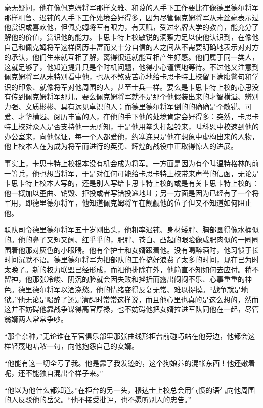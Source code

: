     毫无疑问，他在像佩克姆将军那样文雅、和蔼的人手下工作要比在像德里德尔将军那样粗鲁、迟钝的人手下工作处境会好得多，因为尽管佩克姆将军从未丝毫表示过他赏识或喜欢他，但佩克姆将军有眼力，有天赋，受过名牌大学的教育，能充分了解他的价值，赏识他的能力。卡思卡特上校敏锐的洞察力足以使他认识到，在像他自己和佩克姆将军这样阅历丰富而又十分自信的人之间从不需要明确地表示对对方的承认，他们生来就互相了解，离得很远就能互相产生好感。他们属于同一类人，这就足够了，他知道提升只是个时机问题，他得小心谨慎地等待。不过他又注意到佩克姆将军从未特别看中他，也从不煞费苦心地给卡思卡特上校留下满腹警句和学识的印象、就像将军对他周围的人，甚至士兵一样。要么是卡思卡特上校的心思没有传到佩克姆将军那儿，要么佩克姆将军就不是那个他假装出来的才智横溢、辨别力强、文质彬彬、具有远见卓识的人；而德里德尔将军倒的的确确是个敏锐、可爱、才华横溢、阅历丰富的人，在他的手下他的处境肯定会好得多：突然，卡思卡特上校对众人是否支持他一无所知，于是他用拳头打起铃来，叫科恩中校速到他的办公室来，向他保证，每一个人都爱他，约塞连只是他在想象中虚构出来的人物，他上校本人在为成为将军而进行的英勇、辉煌的战役中正取得惊人的进展。

    事实上，卡思卡特上校根本没有机会成为将军。一方面是因为有个叫温特格林的前一等兵，他也想当将军，于是对任何可能给卡思卡特上校带来声誉的信函，无论是卡思卡特上校本人写的，还是别人写给卡思卡特上校的或是有关卡思卡特上校的：他一概加以歪曲、销毁、拒投或者写错投递地址；另一方面是因为已经有了一个将军用，即德里德尔将军，他知道佩克姆将军在觊觎他的位子但又不知道如何阻止他。

    联队司令德里德尔将军五十岁刚出头，他粗率迟钝、身材矮胖、胸部圆得像水桶似的。他的鼻子又短又阔、红乎乎的，肥胖、苍白、凸起的眼睑像咸肥肉似的一圈圈围着他那对灰色的小眼睛。他有个护士和女婿跟着他。没有喝醉酒时，他习惯于长时间沉默不语。德里德尔将军为把部队的工作搞好浪费了太多的时间，现在已为时太晚了。新的权力联盟已经形成，而祖他排除在外，他简直不知如何去应付。稍不留神，他那张冷峻、阴沉的脸就会因失败和挫折而露出闷闷不乐、心事重重的神色。德里德尔将军以酒浇愁。他的情绪变得反复无常、难以捉摸。“战争就是地狱。”他无论是喝醉了还是清醒时常常这样说，而且他心里也真的是这么想的，然而这并不妨碍他靠战争谋得高官厚禄，也不妨碍他把女婿拉进军队同他在一起，尽管翁婿两人常常争吵。
 


    “那个杂种，”无论谁在军官俱乐部里那张曲线形柜台前碰巧站在他旁边，他都会这样轻蔑地咕哝一句，向他抱怨自己的女婿。

    “他能有这一切全亏了我。他是靠了我发迹的，这个狗娘养的混帐东西！他还嫩着呢，还不能独自混出个样子来。”

    “他以为他什么都知道。”在柜台的另一头，穆达士上校总会用气愤的语气向他周围的人反驳他的岳父。“他不接受批评，也不愿听别人的忠告。”

